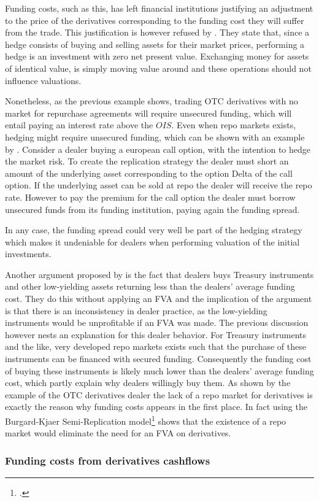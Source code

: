 \documentclass[../main.tex]{subfiles}
\begin{document}
        Funding costs, such as this, has left financial institutions justifying an adjustment to the price of the derivatives
        corresponding to the funding cost they will suffer from the trade.
        This justification is however refused by \cite{HullWhite2012FVA}.
        They state that, since a hedge consists of buying and selling assets for their market prices,
        performing a hedge is an investment with zero net present value.
        Exchanging money for assets of identical value,
        is simply moving value around and these operations should not influence valuations. 

        Nonetheless, as the previous example shows,
        trading OTC derivatives with no market for repurchase agreements will require unsecured funding,
        which will entail paying an interest rate above the $OIS$.
        Even when repo markets exists, hedging might require unsecured funding,
        which can be shown with an example by \cite{Castagna2012FVA}.
        Consider a dealer buying a european call option,
        with the intention to hedge the market risk.
        To create the replication strategy the dealer must short an amount of the underlying asset corresponding to the option Delta of the call option.
        If the underlying asset can be sold at repo the dealer will receive the repo rate.
        However to pay the premium for the call option the dealer must borrow unsecured funds from its funding institution,
        paying again the funding spread. 

        In any case,
        the funding spread could very well be part of the hedging strategy which makes it undeniable for dealers when performing valuation of the initial investments.

        Another argument proposed by \cite{HullWhite2012FVA} is the fact that dealers buys Treasury instruments and other low-yielding assets returning less than the dealers' average funding cost.
        They do this without applying an FVA and the implication of the argument is that there is an inconsistency in dealer practice,
        as the low-yielding instruments would be unprofitable if an FVA was made.
        The previous discussion however nests an explanation for this dealer behavior.
        For Treasury instruments and the like,
        very developed repo markets exists such that the purchase of these instruments can be financed with secured funding.
        Consequently the funding cost of buying these instruments is likely much lower than the dealers' average funding cost,
        which partly explain why dealers willingly buy them.
        As shown by the example of the OTC derivatives dealer the lack of a repo market for derivatives is exactly the reason why funding costs appears in the first place.
        In fact \cite[Section~9.4.1]{Green2015XVA} using the Burgard-Kjaer Semi-Replication model\footcite{BurgardKjaer2013Funding} shows that the existence of a repo market would eliminate the need for an FVA on derivatives. 
        
    \subsubsection{Funding costs from derivatives cashflows}
\end{document}
